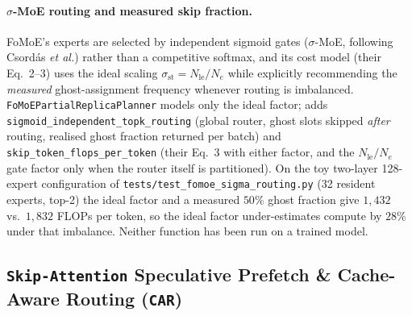 \documentclass[11pt,a4paper]{article}
\begin{document}
\paragraph{$\sigma$-MoE routing and measured skip fraction.} FoMoE's experts are selected by independent sigmoid gates ($\sigma$-MoE, following Csord\'as \textit{et al.}) rather than a competitive softmax, and its cost model (their Eq.~2--3) uses the ideal scaling $\sigma_{\text{st}} = N_{\text{le}}/N_{e}$ while explicitly recommending the \emph{measured} ghost-assignment frequency whenever routing is imbalanced. \texttt{FoMoEPartialReplicaPlanner} models only the ideal factor;  adds \texttt{sigmoid\_independent\_topk\_routing} (global router, ghost slots skipped \emph{after} routing, realised ghost fraction returned per batch) and \texttt{skip\_token\_flops\_per\_token} (their Eq.~3 with either factor, and the $N_{\text{le}}/N_e$ gate factor only when the router itself is partitioned). On the toy two-layer 128-expert configuration of \texttt{tests/test\_fomoe\_sigma\_routing.py} (32 resident experts, top-2) the ideal factor and a measured $50\%$ ghost fraction give $1{,}432$ vs.\ $1{,}832$ FLOPs per token, so the ideal factor under-estimates compute by $28\%$ under that imbalance. Neither function has been run on a trained model.

\subsection{\texttt{Skip-Attention} Speculative Prefetch \& Cache-Aware Routing (\texttt{CAR})}
\end{document}
